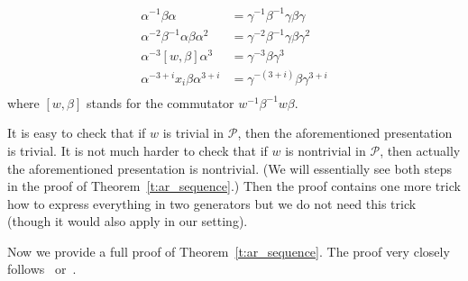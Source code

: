 \documentclass[10pt,a4paper]{article}
\theoremstyle{definition}
\theoremstyle{remark}
\newcommand\PP{\mathcal{P}}
\begin{document}
\begin{align*}
  \alpha^{-1} \beta \alpha &= \gamma^{-1}\beta^{-1}\gamma\beta\gamma \\
  \alpha^{-2}\beta^{-1}\alpha\beta\alpha^{2} &= 
  \gamma^{-2}\beta^{-1}\gamma\beta\gamma^{2} \\
  \alpha^{-3}[w,\beta]\alpha^{3} &= \gamma^{-3}\beta\gamma^3 \\
  \alpha^{-3+i}x_i\beta\alpha^{3+i} &= \gamma^{-(3+i)}\beta\gamma^{3+i} \\
\end{align*}
where $[w,\beta]$ stands for the commutator $w^{-1}\beta^{-1}w\beta$.

It is easy to check that if $w$ is trivial in $\PP$, then the aforementioned
presentation is trivial. It is not much harder to check that if $w$ is
nontrivial in $\PP$, then actually the aforementioned presentation is
nontrivial. (We will essentially see both steps in the proof of
Theorem~\ref{t:ar_sequence}.) Then the proof contains one more trick how to
express everything in two generators but we do not need this trick (though it
would also apply in our setting).
  
  
Now we provide a full proof of Theorem~\ref{t:ar_sequence}. The proof very
closely follows~\cite{miller92} or~\cite{gordon95}.
\end{document}
